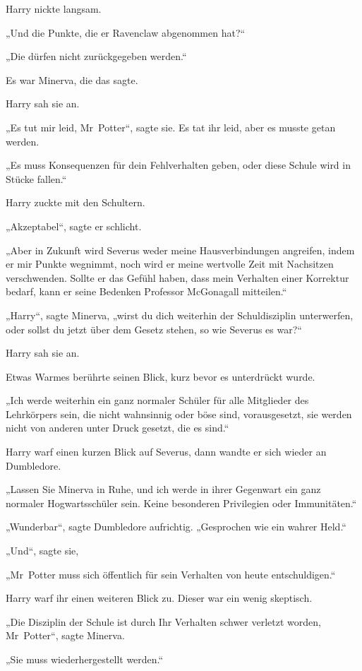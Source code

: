 {Harry nickte langsam.

„Und die Punkte, die er Ravenclaw abgenommen hat?“

„Die dürfen nicht zurückgegeben werden.“

Es war Minerva, die das sagte.

Harry sah sie an.

„Es tut mir leid, Mr~Potter“, sagte sie. Es tat ihr leid, aber es musste getan werden.

„Es muss Konsequenzen für dein Fehlverhalten geben, oder diese Schule wird in Stücke fallen.“

Harry zuckte mit den Schultern.

„Akzeptabel“, sagte er schlicht.

„Aber in Zukunft wird Severus weder meine Hausverbindungen angreifen, indem er mir Punkte wegnimmt, noch wird er meine wertvolle Zeit mit Nachsitzen verschwenden. Sollte er das Gefühl haben, dass mein Verhalten einer Korrektur bedarf, kann er seine Bedenken Professor McGonagall mitteilen.“

„Harry“, sagte Minerva, „wirst du dich weiterhin der Schuldisziplin unterwerfen, oder sollst du jetzt über dem Gesetz stehen, so wie Severus es war?“

Harry sah sie an.

Etwas Warmes berührte seinen Blick, kurz bevor es unterdrückt wurde.

„Ich werde weiterhin ein ganz normaler Schüler für alle Mitglieder des Lehrkörpers sein, die nicht wahnsinnig oder böse sind, vorausgesetzt, sie werden nicht von anderen unter Druck gesetzt, die es sind.“

Harry warf einen kurzen Blick auf Severus, dann wandte er sich wieder an Dumbledore.

„Lassen Sie Minerva in Ruhe, und ich werde in ihrer Gegenwart ein ganz normaler Hogwartsschüler sein. Keine besonderen Privilegien oder Immunitäten.“

„Wunderbar“, sagte Dumbledore aufrichtig. „Gesprochen wie ein wahrer Held.“

„Und“, sagte sie,

„Mr~Potter muss sich öffentlich für sein Verhalten von heute entschuldigen.“

Harry warf ihr einen weiteren Blick zu. Dieser war ein wenig skeptisch.

„Die Disziplin der Schule ist durch Ihr Verhalten schwer verletzt worden, Mr~Potter“, sagte Minerva.

„Sie muss wiederhergestellt werden.“

}

